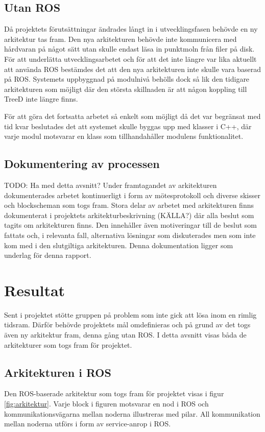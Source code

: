 \subsection{Utan ROS}
Då projektets förutsättningar ändrades långt in i utvecklingsfasen behövde en ny arkitektur tas fram. Den nya arkitekturen behövde inte kommunicera med hårdvaran på något sätt utan skulle endast läsa in punktmoln från filer på disk. För att underlätta utvecklingsarbetet och för att det inte längre var lika aktuellt att använda ROS bestämdes det att den nya arkitekturen inte skulle vara baserad på ROS. Systemets uppbyggnad på modulnivå behölls dock så lik den tidigare arkitekturen som möjligt där den största skillnaden är att någon koppling till TreeD inte längre finns.

För att göra det fortsatta arbetet så enkelt som möjligt då det var begränsat med tid kvar beslutades det att systemet skulle byggas upp med klasser i C++, där varje modul motsvarar en klass som tillhandahåller modulens funktionalitet.

\subsection{Dokumentering av processen}
TODO: Ha med detta avsnitt?
Under framtagandet av arkitekturen dokumenterades arbetet kontinuerligt i form av mötesprotokoll och diverse skisser och blockscheman som togs fram. Stora delar av arbetet med arkitekturen finns dokumenterat i projektets arkitekturbeskrivning (KÄLLA?) där alla beslut som tagits om arkitekturen finns. Den innehåller även motiveringar till de beslut som fattats och, i relevanta fall, alternativa lösningar som diskuterades men som inte kom med i den slutgiltiga arkitekturen. Denna dokumentation ligger som underlag för denna rapport.


\section{Resultat}
\label{sec:results-lundberg}

Sent i projektet stötte gruppen på problem som inte gick att lösa inom en rimlig tidsram. Därför behövde projektets mål omdefinieras och på grund av det togs även ny arkitektur fram, denna gång utan ROS. I detta avsnitt visas båda de arkitekturer som togs fram för projektet.

\subsection{Arkitekturen i ROS}
Den ROS-baserade arkitektur som togs fram för projektet visas i figur \ref{fig:arkitektur}. Varje block i figuren motsvarar en nod i ROS och kommunikationsvägarna mellan noderna illustreras med pilar. All kommunikation mellan noderna utförs i form av service-anrop i ROS.

